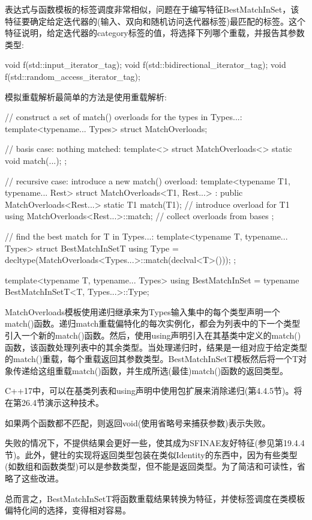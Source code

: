 表达式与函数模板的标签调度非常相似，问题在于编写特征BestMatchInSet，该特征要确定给定迭代器的(输入、双向和随机访问迭代器标签)最匹配的标签。这个特征说明，给定迭代器的category标签的值，将选择下列哪个重载，并报告其参数类型:

\begin{cpp}
void f(std::input_iterator_tag);
void f(std::bidirectional_iterator_tag);
void f(std::random_access_iterator_tag);
\end{cpp}

模拟重载解析最简单的方法是使用重载解析:

\begin{cpp}
// construct a set of match() overloads for the types in Types...:
template<typename... Types>
struct MatchOverloads;

// basis case: nothing matched:
template<>
struct MatchOverloads<> {
	static void match(...);
};

// recursive case: introduce a new match() overload:
template<typename T1, typename... Rest>
struct MatchOverloads<T1, Rest...> : public MatchOverloads<Rest...> {
	static T1 match(T1); // introduce overload for T1
	using MatchOverloads<Rest...>::match; // collect overloads from bases
};

// find the best match for T in Types...:
template<typename T, typename... Types>
struct BestMatchInSetT {
	using Type = decltype(MatchOverloads<Types...>::match(declval<T>()));
};

template<typename T, typename... Types>
using BestMatchInSet = typename BestMatchInSetT<T, Types...>::Type;
\end{cpp}

MatchOverloads模板使用递归继承来为Types输入集中的每个类型声明一个match()函数。递归match重载偏特化的每次实例化，都会为列表中的下一个类型引入一个新的match()函数。然后，使用using声明引入在其基类中定义的match()函数，该函数处理列表中的其余类型。当处理递归时，结果是一组对应于给定类型的match()重载，每个重载返回其参数类型。BestMatchInSetT模板然后将一个T对象传递给这组重载match()函数，并生成所选(最佳)match()函数的返回类型。

\begin{notice}
C++17中，可以在基类列表和using声明中使用包扩展来消除递归(第4.4.5节)。将在第26.4节演示这种技术。
\end{notice}

如果两个函数都不匹配，则返回void(使用省略号来捕获参数)表示失败。

\begin{notice}
失败的情况下，不提供结果会更好一些，使其成为SFINAE友好特征(参见第19.4.4节)。此外，健壮的实现将返回类型包装在类似Identity的东西中，因为有些类型(如数组和函数类型)可以是参数类型，但不能是返回类型。为了简洁和可读性，省略了这些改进。
\end{notice}

总而言之，BestMatchInSetT将函数重载结果转换为特征，并使标签调度在类模板偏特化间的选择，变得相对容易。










